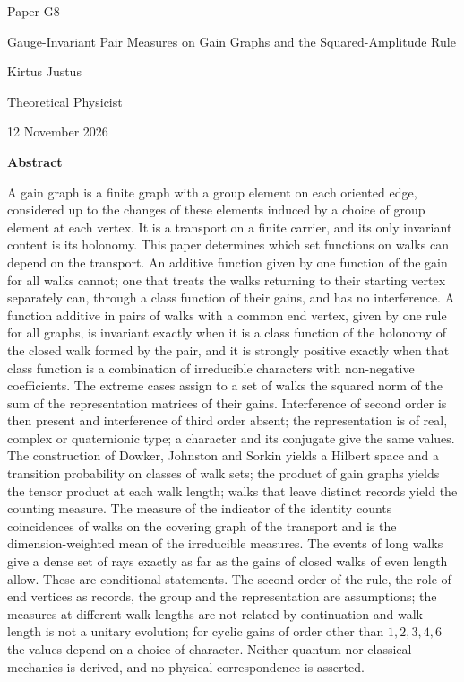 \documentclass[11pt,a4paper]{article}
\begin{document}
\begin{titlepage}
{\small\sffamily \ProgramTitle\hfill Paper G8\par}
\vspace*{8mm}
{\LARGE\bfseries\raggedright{} Gauge-Invariant Pair Measures on Gain Graphs and the Squared-Amplitude Rule\par}
\vspace{9mm}
{\large Kirtus Justus\par}
\vspace{1mm}
Theoretical Physicist\par
\AuthorLocation\par
\vspace{2mm}
12 November 2026\par
\vspace{8mm}
\textbf{Abstract}\par
A gain graph is a finite graph with a group element on each oriented edge, considered up to the changes of these elements induced by a choice of group element at each vertex. It is a transport on a finite carrier, and its only invariant content is its holonomy. This paper determines which set functions on walks can depend on the transport. An additive function given by one function of the gain for all walks cannot; one that treats the walks returning to their starting vertex separately can, through a class function of their gains, and has no interference. A function additive in pairs of walks with a common end vertex, given by one rule for all graphs, is invariant exactly when it is a class function of the holonomy of the closed walk formed by the pair, and it is strongly positive exactly when that class function is a combination of irreducible characters with non-negative coefficients. The extreme cases assign to a set of walks the squared norm of the sum of the representation matrices of their gains. Interference of second order is then present and interference of third order absent; the representation is of real, complex or quaternionic type; a character and its conjugate give the same values. The construction of Dowker, Johnston and Sorkin yields a Hilbert space and a transition probability on classes of walk sets; the product of gain graphs yields the tensor product at each walk length; walks that leave distinct records yield the counting measure. The measure of the indicator of the identity counts coincidences of walks on the covering graph of the transport and is the dimension-weighted mean of the irreducible measures. The events of long walks give a dense set of rays exactly as far as the gains of closed walks of even length allow. These are conditional statements. The second order of the rule, the role of end vertices as records, the group and the representation are assumptions; the measures at different walk lengths are not related by continuation and walk length is not a unitary evolution; for cyclic gains of order other than $1,2,3,4,6$ the values depend on a choice of character. Neither quantum nor classical mechanics is derived, and no physical correspondence is asserted.\par

\end{titlepage}
\end{document}

